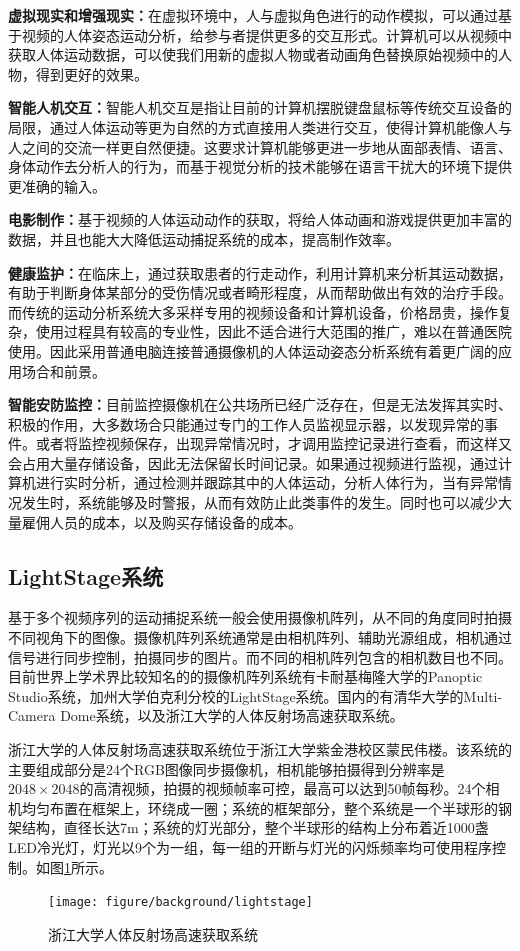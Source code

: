 \textbf{虚拟现实和增强现实：}在虚拟环境中，人与虚拟角色进行的动作模拟，可以通过基于视频的人体姿态运动分析，给参与者提供更多的交互形式。计算机可以从视频中获取人体运动数据，可以使我们用新的虚拟人物或者动画角色替换原始视频中的人物，得到更好的效果。

\textbf{智能人机交互：}智能人机交互是指让目前的计算机摆脱键盘鼠标等传统交互设备的局限，通过人体运动等更为自然的方式直接用人类进行交互，使得计算机能像人与人之间的交流一样更自然便捷。这要求计算机能够更进一步地从面部表情、语言、身体动作去分析人的行为，而基于视觉分析的技术能够在语言干扰大的环境下提供更准确的输入。

\textbf{电影制作：}基于视频的人体运动动作的获取，将给人体动画和游戏提供更加丰富的数据，并且也能大大降低运动捕捉系统的成本，提高制作效率。

\textbf{健康监护：}在临床上，通过获取患者的行走动作，利用计算机来分析其运动数据，有助于判断身体某部分的受伤情况或者畸形程度，从而帮助做出有效的治疗手段。而传统的运动分析系统大多采样专用的视频设备和计算机设备，价格昂贵，操作复杂，使用过程具有较高的专业性，因此不适合进行大范围的推广，难以在普通医院使用。因此采用普通电脑连接普通摄像机的人体运动姿态分析系统有着更广阔的应用场合和前景。

\textbf{智能安防监控：}目前监控摄像机在公共场所已经广泛存在，但是无法发挥其实时、积极的作用，大多数场合只能通过专门的工作人员监视显示器，以发现异常的事件。或者将监控视频保存，出现异常情况时，才调用监控记录进行查看，而这样又会占用大量存储设备，因此无法保留长时间记录。如果通过视频进行监视，通过计算机进行实时分析，通过检测并跟踪其中的人体运动，分析人体行为，当有异常情况发生时，系统能够及时警报，从而有效防止此类事件的发生。同时也可以减少大量雇佣人员的成本，以及购买存储设备的成本。

\subsection{LightStage系统}
基于多个视频序列的运动捕捉系统一般会使用摄像机阵列，从不同的角度同时拍摄不同视角下的图像。摄像机阵列系统通常是由相机阵列、辅助光源组成，相机通过信号进行同步控制，拍摄同步的图片。而不同的相机阵列包含的相机数目也不同。目前世界上学术界比较知名的的摄像机阵列系统有卡耐基梅隆大学的Panoptic Studio系统，加州大学伯克利分校的LightStage系统。国内的有清华大学的Multi-Camera Dome系统，以及浙江大学的人体反射场高速获取系统。

浙江大学的人体反射场高速获取系统位于浙江大学紫金港校区蒙民伟楼。该系统的主要组成部分是24个RGB图像同步摄像机，相机能够拍摄得到分辨率是\(2048\times 2048\)的高清视频，拍摄的视频帧率可控，最高可以达到50帧每秒。24个相机均匀布置在框架上，环绕成一圈；系统的框架部分，整个系统是一个半球形的钢架结构，直径长达7m；系统的灯光部分，整个半球形的结构上分布着近1000盏LED冷光灯，灯光以9个为一组，每一组的开断与灯光的闪烁频率均可使用程序控制。如图\ref{fig:lightstage}所示。
\begin{figure}[htbp]
    \centering
    \texttt{[image: figure/background/lightstage]}
    \caption{\label{fig:lightstage} 浙江大学人体反射场高速获取系统}
\end{figure}

